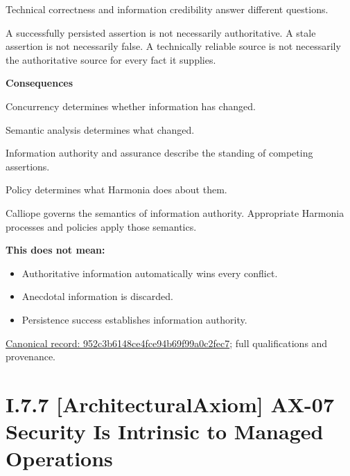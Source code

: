 Technical correctness and information credibility answer different
questions.



A successfully persisted assertion is not necessarily authoritative. A
stale assertion is not necessarily false. A technically reliable source
is not necessarily the authoritative source for every fact it supplies.



\par\medskip\textbf{Consequences}\par


Concurrency determines whether information has changed.



Semantic analysis determines what changed.



Information authority and assurance describe the standing of competing
assertions.



Policy determines what Harmonia does about them.



Calliope governs the semantics of information authority. Appropriate
Harmonia processes and policies apply those semantics.



\textbf{This does not mean:}



\begin{itemize}


\item Authoritative information automatically wins every conflict.

\item Anecdotal information is discarded.

\item Persistence success establishes information authority.

\end{itemize}

{\footnotesize \href{../../../../../../../../continuum/motivation/principle/952c3b6148ce4fce94b69f99a0c2fec7.md}{Canonical record: 952c3b6148ce4fce94b69f99a0c2fec7}; full qualifications and provenance.}\par
\section*{I.7.7 [ArchitecturalAxiom] AX-07 Security Is Intrinsic to Managed Operations}
\label{navigation:I.7.7}

